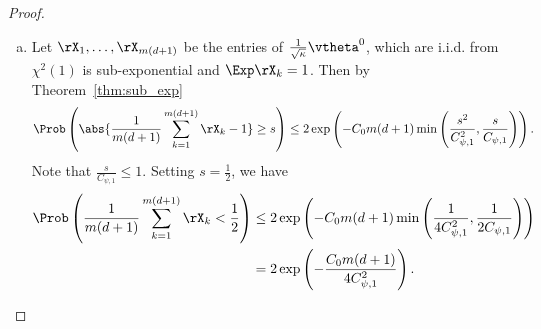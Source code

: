 \documentclass{article}
\begin{document}
\begin{proof}
\begin{enumerate}[(a)]
\begin{enumerate}[(i)]
\begin{equation}
\begin{aligned}
                            \end{aligned}
                        \end{equation}
                        we have
                        \begin{equation}\label{thm-proof:step2}
                            \norm{G^{(\vw)}(\vtheta(t))-G^{(\vw)}(\vtheta(0))}_F\leq\frac{1}{8}\left(\frac{\kappa}{\kappa'}\lambda_S^{(a)}+\kappa\kappa'\lambda_S^{(\vw)}\right)
                        \end{equation}
                  \item For $t\in[0,t^*)$,
                        \begin{equation}
                            \RS(\vtheta(t))\leq\exp\left(-\frac{m}{n}\left(\frac{\kappa}{\kappa'}\lambda_S^{(a)}+\kappa\kappa'\lambda_S^{(\vw)}\right)t\right)\RS(\vtheta^0)\leq\exp\left(-\frac{2m\kappa\lambda_S}{n}\right)\RS(\vtheta^0).
                        \end{equation}
                        Suppose that $t^*<+\infty$ then one can take the limit $t\to t^*$ in~\eqref{thm-proof:step1} and~\eqref{thm-proof:step2}. This will lead to a contradiction with the definition of $t^*$. Therefore $t^*=+\infty$.
              \end{enumerate}
        \item Let $\rX_1, \ldots, \rX_{m(d+1)}$ be the entries of $\frac{1}{\sqrt{\kappa}}\vtheta^0$, which are i.i.d. from $\chi^2(1)$ is sub-exponential and $\Exp\rX_k=1$. Then by Theorem~\ref{thm:sub_exp}
              \begin{equation}
                  \Prob\left(\abs{\frac{1}{m(d+1)}\sum_{k=1}^{m(d+1)}\rX_k-1}\geq s\right)\leq 2\exp\left(-C_0 m(d+1) \min\left(\frac{s^2}{C^2_{\psi,1}},\frac{s}{C_{\psi,1}}\right)\right).
              \end{equation}
              Note that $\frac{s}{C_{\psi,1}}\leq 1$. Setting $s=\frac{1}{2}$, we have
              \begin{equation}
                  \begin{aligned}
                      \Prob\left(\frac{1}{m(d+1)}\sum_{k=1}^{m(d+1)}\rX_k<\frac{1}{2}\right)
                       & \leq 2\exp\left(-C_0 m(d+1) \min\left(\frac{1}{4C^2_{\psi,1}},\frac{1}{2C_{\psi,1}}\right)\right) \\
                       & =2\exp\left(-\frac{C_0m(d+1)}{4C^2_{\psi,1}}\right).
                  \end{aligned}
              \end{equation}

\end{enumerate}
\end{proof}
\end{document}
